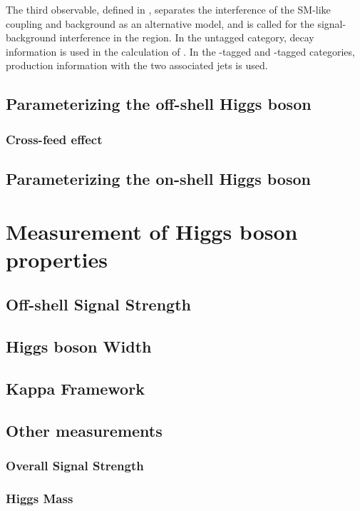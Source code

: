 The third observable, \Dint defined in , separates the interference
of the SM-like \Hboson coupling and background as an alternative model, and is called
\Dbsi for the signal-background interference in the \offshell region.
In the untagged category, decay information is used in the calculation of \Dint.
In the \VBF-tagged and \VH-tagged categories, production information with the two associated jets is used.

\subsection{Parameterizing the off-shell Higgs boson}

\subsubsection{Cross-feed effect}

\subsection{Parameterizing the on-shell Higgs boson}

\section{Measurement of Higgs boson properties}

\subsection{Off-shell Signal Strength}

\subsection{Higgs boson Width}

\subsection{Kappa Framework}

\subsection{Other measurements}

\subsubsection{Overall Signal Strength}

\subsubsection{Higgs Mass}

